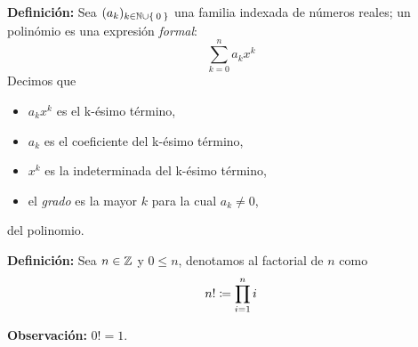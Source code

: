 \textbf{Definición:} Sea $(a_k)_{k\in \mathbb{N}\cup\Set{0}}$ una familia indexada de números reales; un polinómio es una expresión \textit{formal}: \[\sum_{k=0}^{n} a_k x^k\]
Decimos que
\begin{itemize}
  \item $a_k x^k$ es el k-ésimo término,
  \item $a_k$ es el coeficiente del k-ésimo término,
  \item $x^k$ es la indeterminada del k-ésimo término,
  \item el \textit{grado} es la mayor $k$ para la cual $a_k\neq 0$,
\end{itemize}
del polinomio.

\textbf{Definición:} Sea $n\in \mathbb{Z}$ y $0\leq n$, denotamos al factorial de $n$ como \[n!\coloneqq \prod_{i=1}^{n}i\]

\textbf{Observación:} $0!=1$.
